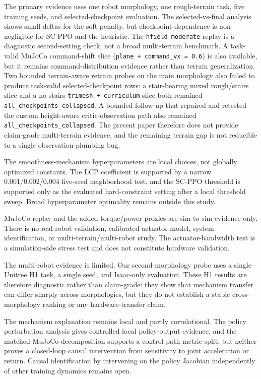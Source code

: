 \documentclass[10pt]{article}
\begin{document}
The primary evidence uses one robot morphology, one rough-terrain task, five
training seeds, and selected-checkpoint evaluation. The selected-vs-final
analysis shows small deltas for the soft penalty, but checkpoint dependence is
non-negligible for SC-PPO and the heuristic. The \texttt{hfield\_moderate}
replay is a diagnostic second-setting check, not a broad multi-terrain
benchmark. A task-valid MuJoCo command-shift slice
(\texttt{plane + command\_vx = 0.6}) is also available, but it remains
command-distribution evidence rather than terrain generalization. Two bounded
terrain-aware retrain probes on the main morphology also failed to produce
task-valid selected-checkpoint rows: a stair-bearing mixed rough/stairs slice
and a no-stairs \texttt{trimesh + curriculum} slice both remained
\texttt{all\_checkpoints\_collapsed}. A bounded follow-up that repaired and
retested the custom height-aware critic-observation path also remained
\texttt{all\_checkpoints\_collapsed}. The present paper therefore does not
provide claim-grade multi-terrain evidence, and the remaining terrain gap is
not reducible to a single observation-plumbing bug.

The smoothness-mechanism hyperparameters are local choices, not globally
optimized constants. The LCP coefficient is supported by a narrow
0.001/0.002/0.004 five-seed neighborhood test, and the SC-PPO threshold is
supported only as the evaluated hard-constraint setting after a local threshold
sweep. Broad hyperparameter optimality remains outside this study.

MuJoCo replay and the added torque/power proxies are sim-to-sim evidence only.
There is no real-robot validation, calibrated actuator model, system
identification, or multi-terrain/multi-robot study. The actuator-bandwidth test
is a simulation-side stress test and does not constitute hardware validation.

The multi-robot evidence is limited. Our second-morphology probe uses a single
Unitree H1 task, a single seed, and Isaac-only evaluation. These H1 results are
therefore diagnostic rather than claim-grade: they show that mechanism transfer
can differ sharply across morphologies, but they do not establish a stable
cross-morphology ranking or any hardware-transfer claim.

The mechanism explanation remains local and partly correlational. The policy
perturbation analysis gives controlled local policy-output evidence, and the
matched MuJoCo decomposition supports a control-path metric split, but neither
proves a closed-loop causal intervention from sensitivity to joint acceleration
or return. Causal identification by intervening on the policy Jacobian
independently of other training dynamics remains open.
\end{document}
